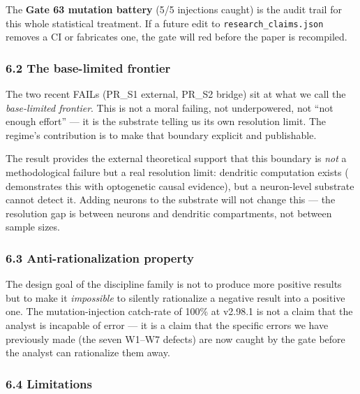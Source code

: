 \documentclass[
]{article}
\begin{document}
The \textbf{Gate 63 mutation battery} (5/5 injections caught) is the
audit trail for this whole statistical treatment. If a future edit to
\texttt{research\_claims.json} removes a CI or fabricates one, the gate
will red before the paper is recompiled.

\subsubsection{6.2 The base-limited
frontier}\label{the-base-limited-frontier}

The two recent FAILs (PR\_S1 external, PR\_S2 \citet{ref35} bridge) sit at
what we call the \emph{base-limited frontier}. This is not a moral
failing, not underpowered, not ``not enough effort'' --- it is the
substrate telling us its own resolution limit. The regime's contribution
is to make that boundary explicit and publishable.

The \citet{ref35} result provides the external theoretical support that this
boundary is \emph{not} a methodological failure but a real resolution
limit: dendritic computation exists (\citet{ref35} demonstrates this with
optogenetic causal evidence), but a neuron-level substrate cannot detect
it. Adding neurons to the substrate will not change this --- the
resolution gap is between neurons and dendritic compartments, not
between sample sizes.

\subsubsection{6.3 Anti-rationalization
property}\label{anti-rationalization-property}

The design goal of the discipline family is not to produce more positive
results but to make it \emph{impossible} to silently rationalize a
negative result into a positive one. The mutation-injection catch-rate
of 100\% at v2.98.1 is not a claim that the analyst is incapable of
error --- it is a claim that the specific errors we have previously made
(the seven W1--W7 defects) are now caught by the gate before the analyst
can rationalize them away.

\subsubsection{6.4 Limitations}\label{limitations}
\end{document}
